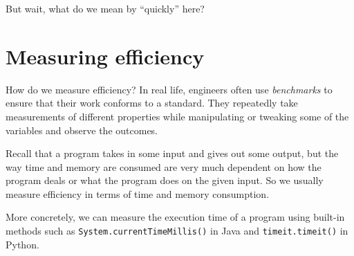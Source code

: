 But wait, what do we mean by ``quickly'' here?


\section{Measuring efficiency}
\label{sec:measuring-efficiency}

How do we measure efficiency? In real life, engineers often use \textit{benchmarks} to ensure that their work conforms to a standard. They repeatedly take measurements of different properties while manipulating or tweaking some of the variables and observe the outcomes. 

Recall that a program takes in some input and gives out some output, but the way time and memory are consumed are very much dependent on how the program deals or what the program does on the given input. So we usually measure efficiency in terms of time and memory consumption.

More concretely, we can measure the execution time of a program using built-in methods such as \texttt{System.currentTimeMillis()} in Java and \texttt{timeit.timeit()} in Python.

